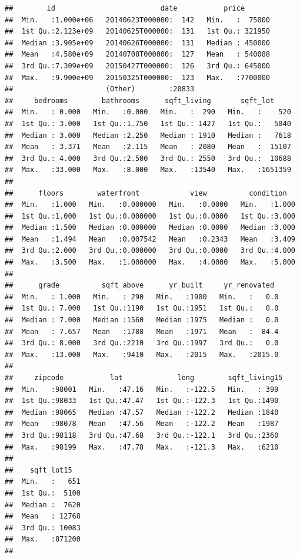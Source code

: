 \documentclass[]{article}
\begin{document}
\begin{verbatim}
##        id                         date           price        
##  Min.   :1.000e+06   20140623T000000:  142   Min.   :  75000  
##  1st Qu.:2.123e+09   20140625T000000:  131   1st Qu.: 321950  
##  Median :3.905e+09   20140626T000000:  131   Median : 450000  
##  Mean   :4.580e+09   20140708T000000:  127   Mean   : 540088  
##  3rd Qu.:7.309e+09   20150427T000000:  126   3rd Qu.: 645000  
##  Max.   :9.900e+09   20150325T000000:  123   Max.   :7700000  
##                      (Other)        :20833                    
##     bedrooms        bathrooms      sqft_living       sqft_lot      
##  Min.   : 0.000   Min.   :0.000   Min.   :  290   Min.   :    520  
##  1st Qu.: 3.000   1st Qu.:1.750   1st Qu.: 1427   1st Qu.:   5040  
##  Median : 3.000   Median :2.250   Median : 1910   Median :   7618  
##  Mean   : 3.371   Mean   :2.115   Mean   : 2080   Mean   :  15107  
##  3rd Qu.: 4.000   3rd Qu.:2.500   3rd Qu.: 2550   3rd Qu.:  10688  
##  Max.   :33.000   Max.   :8.000   Max.   :13540   Max.   :1651359  
##                                                                    
##      floors        waterfront            view          condition    
##  Min.   :1.000   Min.   :0.000000   Min.   :0.0000   Min.   :1.000  
##  1st Qu.:1.000   1st Qu.:0.000000   1st Qu.:0.0000   1st Qu.:3.000  
##  Median :1.500   Median :0.000000   Median :0.0000   Median :3.000  
##  Mean   :1.494   Mean   :0.007542   Mean   :0.2343   Mean   :3.409  
##  3rd Qu.:2.000   3rd Qu.:0.000000   3rd Qu.:0.0000   3rd Qu.:4.000  
##  Max.   :3.500   Max.   :1.000000   Max.   :4.0000   Max.   :5.000  
##                                                                     
##      grade          sqft_above      yr_built     yr_renovated   
##  Min.   : 1.000   Min.   : 290   Min.   :1900   Min.   :   0.0  
##  1st Qu.: 7.000   1st Qu.:1190   1st Qu.:1951   1st Qu.:   0.0  
##  Median : 7.000   Median :1560   Median :1975   Median :   0.0  
##  Mean   : 7.657   Mean   :1788   Mean   :1971   Mean   :  84.4  
##  3rd Qu.: 8.000   3rd Qu.:2210   3rd Qu.:1997   3rd Qu.:   0.0  
##  Max.   :13.000   Max.   :9410   Max.   :2015   Max.   :2015.0  
##                                                                 
##     zipcode           lat             long        sqft_living15 
##  Min.   :98001   Min.   :47.16   Min.   :-122.5   Min.   : 399  
##  1st Qu.:98033   1st Qu.:47.47   1st Qu.:-122.3   1st Qu.:1490  
##  Median :98065   Median :47.57   Median :-122.2   Median :1840  
##  Mean   :98078   Mean   :47.56   Mean   :-122.2   Mean   :1987  
##  3rd Qu.:98118   3rd Qu.:47.68   3rd Qu.:-122.1   3rd Qu.:2360  
##  Max.   :98199   Max.   :47.78   Max.   :-121.3   Max.   :6210  
##                                                                 
##    sqft_lot15    
##  Min.   :   651  
##  1st Qu.:  5100  
##  Median :  7620  
##  Mean   : 12768  
##  3rd Qu.: 10083  
##  Max.   :871200  
## 
\end{verbatim}
\end{document}
